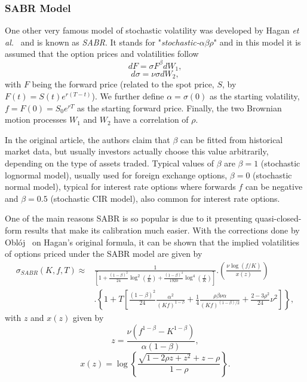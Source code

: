 \subsubsection{SABR Model}
One other very famous model of stochastic volatility was developed by Hagan \textit{et al.}~\cite{Hagan} and is known as \emph{SABR}. It stands for "\emph{stochastic-}$\alpha\beta\rho$" and in this model it is assumed that the option prices and volatilities follow
\begin{equation}\label{dF}
dF=\sigma F^\beta dW_1,
\end{equation}
\begin{equation}\label{dsigma}
d\sigma=\nu\sigma dW_2,
\end{equation}
\noindent with $F$ being the forward price (related to the spot price, $S$, by $F(t)=S(t)e^{r(T-t)}$).
We further define $\alpha=\sigma(0)$ as the starting volatility, $f=F(0)=S_0e^{rT}$ as the starting forward price. Finally, the two Brownian motion processes $W_1$ and $W_2$ have a correlation of $\rho$.

\iffalse
It should be noted that we are now using the \hl{forward measure}, so in eq.\eqref{dF} we use $F$, the \emph{forward price}, instead of the usual spot price $S$ from eq.  \ref{GBM}. These two quantities are related by $S(t)=e^{-r(T-t)}F(t)$, so we can easily obtain one from the other.
\fi


In the original article, the authors claim that $\beta$ can be fitted from historical market data, but usually investors actually choose this value arbitrarily, depending on the type of assets traded. Typical values of $\beta$ are $\beta=1$ (stochastic lognormal model), usually used for foreign exchange options, $\beta=0$ (stochastic normal model), typical for interest rate options where forwards $f$ can be negative and $\beta=0.5$ (stochastic CIR model), also common for interest rate options.

One of the main reasons SABR is so popular is due to it presenting quasi-closed-form results that make its calibration much easier. With the corrections done by Oblój~\cite{Obloj} on Hagan's original formula, it can be shown that the implied volatilities of options priced under the SABR model are given by
\begin{equation}
\begin{split}
\sigma_{SABR}(K,f,T)\approx&\frac{1}{\displaystyle\left[1+\frac{(1-\beta)^2}{24}\log^2\left(\frac{f}{K}\right)+\frac{(1-\beta)^4}{1920}\log^4\left(\frac{f}{K}\right)\right]}.\left(\frac{\nu\log\left(f/K\right)}{x(z)}\right)\\
&.\left\{1+T\left[\frac{(1-\beta)^2}{24}\frac{\alpha^2}{(Kf)^{1-\beta}}+\frac{1}{4}\frac{\rho\beta\nu\alpha}{(Kf)^{(1-\beta)/2}}+\frac{2-3\rho^2}{24}\nu^2\right]\right\},
\end{split}
\end{equation}
\noindent with $z$ and $x(z)$ given by
\begin{equation}
z=\frac{\nu\left(f^{1-\beta}-K^{1-\beta}\right)}{\alpha(1-\beta)},
\end{equation}
\begin{equation}
x(z)=\log\left\{\frac{\sqrt{1-2\rho z+z^2}+z-\rho}{1-\rho}\right\}.
\end{equation}

